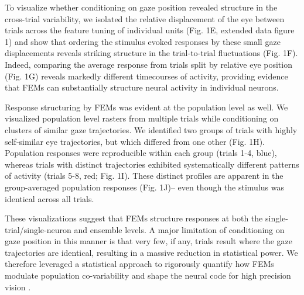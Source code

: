 \documentclass{lite}
\begin{document}
To visualize whether conditioning on gaze position revealed structure in the cross-trial variability, we isolated the relative displacement of the eye between trials across the feature tuning of individual units (Fig. 1E, extended data figure 1) and show that ordering the stimulus evoked responses by these small gaze displacements reveals striking structure in the trial-to-trial fluctuations (Fig. 1F). Indeed, comparing the average response from trials split by relative eye position (Fig. 1G) reveals markedly different timecourses of activity, providing evidence that FEMs can substantially structure neural activity in individual neurons.

Response structuring by FEMs was evident at the population level as well. We visualized population level rasters from multiple trials while conditioning on clusters of similar gaze trajectories. We identified two groups of trials with highly self-similar eye trajectories, but which differed from one other (Fig. 1H). Population responses were reproducible within each group (trials 1-4, blue), whereas trials with distinct trajectories exhibited systematically different patterns of activity (trials 5-8, red; Fig. 1I). These distinct profiles are apparent in the group-averaged population responses (Fig. 1J)-- even though the stimulus was identical across all trials. 

These visualizations suggest that FEMs structure responses at both the single-trial/single-neuron and ensemble levels. A major limitation of conditioning on gaze position in this manner is that very few, if any, trials result where the gaze trajectories are identical, resulting in a massive reduction in statistical power. We therefore leveraged a statistical approach to rigorously quantify how FEMs modulate population co-variability and shape the neural code for high precision vision \cite{mcfarland2016variability}. 

\end{document}
